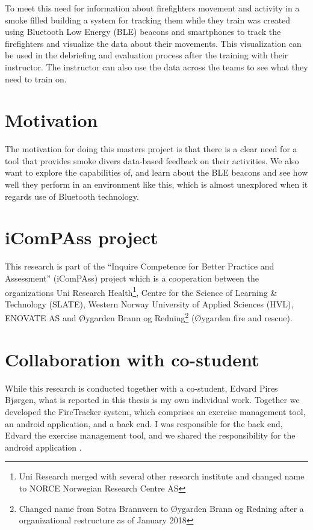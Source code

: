 \documentclass[../Main/thesis.tex]{subfiles}
\begin{document}
To meet this need for information about firefighters movement and activity in a smoke filled building a system for tracking them while they train was created using Bluetooth Low Energy (BLE) beacons and smartphones to track the firefighters and visualize the data about their movements. 
This visualization can be used in the debriefing and evaluation process after the training with their instructor.
The instructor can also use the data across the teams to see what they need to train on.

\section{Motivation}
The motivation for doing this masters project is that there is a clear need for a tool that provides smoke divers data-based feedback on their activities.
We also want to explore the capabilities of, and learn about the BLE beacons and see how well they perform in an environment like this, which is almost unexplored when it regards use of Bluetooth technology. 

\section{iComPAss project}
This research is part of the ``Inquire Competence for Better Practice and Assessment'' (iComPAss) project which is a cooperation between the organizations Uni Research Health\footnote{Uni Research merged with several other research institute and changed name to NORCE Norwegian Research Centre AS}, Centre for the Science of Learning \& Technology (SLATE), Western Norway University of Applied Sciences (HVL), ENOVATE AS and Øygarden Brann og Redning\footnote{Changed name from Sotra Brannvern to Øygarden Brann og Redning after a organizational restructure as of January 2018} (Øygarden fire and rescue).
\citep{Netteland2016}

\section{Collaboration with co-student}
While this research is conducted together with a co-student, Edvard Pires Bjørgen, what is reported in this thesis is my own individual work.
Together we developed the FireTracker system, which comprises an exercise management tool, an android application, and a back end.
I was responsible for the back end, Edvard the exercise management tool, and we shared the responsibility for the android application \citep{Bjorgen2018}.
\end{document}
